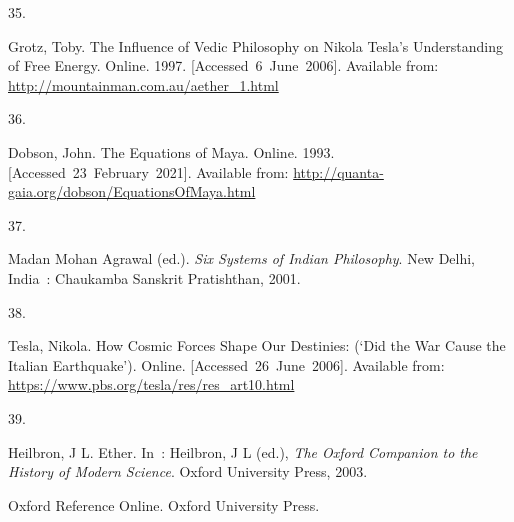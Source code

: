 \documentclass[
  a4paper,
]{article}
\newlength{\cslhangindent}
\newlength{\csllabelwidth}
\newlength{\cslentryspacingunit} %
\newenvironment{CSLReferences}[2] %
 {%
  \setlength{\parindent}{0pt}
  \ifodd #1
  \let\oldpar\par
  \def\par{\hangindent=\cslhangindent\oldpar}
  \fi
  \setlength{\parskip}{#2\cslentryspacingunit}
 }%
 {}
\newcommand{\CSLLeftMargin}[1]{\parbox[t]{\csllabelwidth}{#1}}
\newcommand{\CSLRightInline}[1]{\parbox[t]{\linewidth - \csllabelwidth}{#1}\break}
\begin{document}
\begin{CSLReferences}{0}{0}
\leavevmode{}%
\CSLLeftMargin{35. }%
\CSLRightInline{Grotz, Toby. {The Influence of Vedic Philosophy on
Nikola Tesla's Understanding of Free Energy}. Online. 1997.
{[}Accessed~6~June~2006{]}. Available from:
\url{http://mountainman.com.au/aether_1.html}}

\leavevmode{}%
\CSLLeftMargin{36. }%
\CSLRightInline{Dobson, John. {The Equations of Maya}. Online. 1993.
{[}Accessed~23~February~2021{]}. Available from:
\url{http://quanta-gaia.org/dobson/EquationsOfMaya.html}}

\leavevmode{}%
\CSLLeftMargin{37. }%
\CSLRightInline{Madan Mohan Agrawal (ed.). \emph{{Six Systems of Indian
Philosophy}}. New Delhi, India~: Chaukamba Sanskrit Pratishthan, 2001. }

\leavevmode{}%
\CSLLeftMargin{38. }%
\CSLRightInline{Tesla, Nikola. {How Cosmic Forces Shape Our Destinies:
({`Did the War Cause the Italian Earthquake'})}. Online.
{[}Accessed~26~June~2006{]}. Available from:
\url{https://www.pbs.org/tesla/res/res_art10.html}}

\leavevmode{}%
\CSLLeftMargin{39. }%
\CSLRightInline{Heilbron, J L. Ether. In~: Heilbron, J L (ed.),
\emph{{The Oxford Companion to the History of Modern Science}}. Oxford
University Press, 2003. }%
\CSLRightInline{{Oxford Reference Online. Oxford University Press.}}

\end{CSLReferences}
\end{document}
